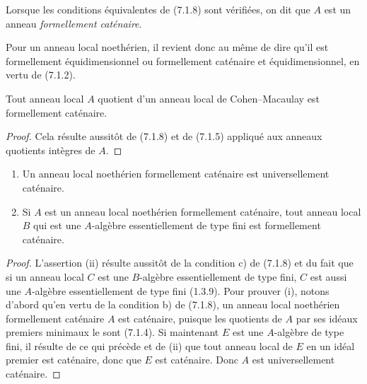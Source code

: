 \begin{definition}[7.1.9]
\label{IV.2.s7.1.9-fr}
Lorsque les conditions équivalentes de (7.1.8) sont vérifiées, on dit que
$A$ est un anneau \emph{formellement caténaire}.
\end{definition}

Pour un anneau local noethérien, il revient donc au même de dire qu'il est
formellement équidimensionnel ou formellement caténaire et
équidimensionnel, en vertu de (7.1.2).

\begin{proposition}[7.1.10]
\label{IV.2.s7.1.10-fr}
Tout anneau local $A$ quotient d'un anneau local de Cohen--Macaulay est
formellement caténaire.
\end{proposition}

\begin{proof}
Cela résulte aussitôt de (7.1.8) et de (7.1.5) appliqué aux anneaux
quotients intègres de $A$.
\end{proof}

\begin{proposition}[7.1.11]
\label{IV.2.s7.1.11-fr}
\begin{enumerate}
\item[(i)] Un anneau local noethérien formellement caténaire est universellement
caténaire.
\item[(ii)] Si $A$ est un anneau local noethérien formellement caténaire, tout
anneau local $B$ qui est une $A$-algèbre essentiellement de type fini est
formellement caténaire.
\end{enumerate}
\end{proposition}

\begin{proof}
L'assertion (ii) résulte aussitôt de la condition c) de (7.1.8) et du fait
que si un anneau local $C$ est une $B$-algèbre essentiellement de type
fini, $C$ est aussi une $A$-algèbre essentiellement de type fini (1.3.9).
Pour prouver (i), notons d'abord qu'en vertu de la condition b) de (7.1.8),
un anneau local noethérien formellement caténaire $A$ est caténaire,
puisque les quotients de $A$ par ses idéaux premiers minimaux le sont
(7.1.4). Si maintenant $E$ est une $A$-algèbre de type fini, il résulte de
ce qui précède et de (ii) que tout anneau local de $E$ en un idéal premier
est caténaire, donc que $E$ est caténaire. Donc $A$ est universellement
caténaire.
\end{proof}

